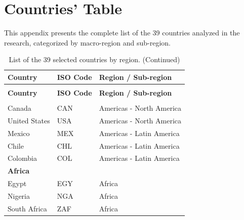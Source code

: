 \chapter{Countries' Table}
This appendix presents the complete list of the 39 countries analyzed in the research, categorized by macro-region and sub-region.

\begin{longtable}{llp{6cm}}
\caption{List of the 39 selected countries by region.} \label{tab:selected_countries} \\
\toprule
\textbf{Country} & \textbf{ISO Code} & \textbf{Region / Sub-region} \\
\midrule
\endfirsthead

\caption[]{List of the 39 selected countries by region. (Continued)} \\
\toprule
\textbf{Country} & \textbf{ISO Code} & \textbf{Region / Sub-region} \\
\midrule
\endhead

\bottomrule
\endfoot

\multicolumn{3}{l}{\textbf{Americas}} \\
\midrule
Canada & CAN & Americas - North America \\
United States & USA & Americas - North America \\
Mexico & MEX & Americas - Latin America \\
Chile & CHL & Americas - Latin America \\
Colombia & COL & Americas - Latin America \\
\midrule

\multicolumn{3}{l}{\textbf{Africa}} \\
\midrule
Egypt & EGY & Africa \\
Nigeria & NGA & Africa \\
South Africa & ZAF & Africa \\
\midrule


\end{longtable}
